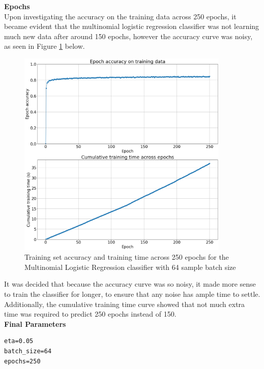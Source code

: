 \documentclass[11pt,a4paper]{article}
\begin{document}
\noindent \textbf{Epochs}\\
Upon investigating the accuracy on the training data across 250 epochs, it became evident that the multinomial logistic regression classifier was not learning much new data after around 150 epochs, however the accuracy curve was noisy, as seen in Figure \ref{fig:mlr_epoch_test} below.\\
    
\begin{figure}[H]
    \centering
    \includegraphics[width=0.9\textwidth]{img/mlr_epoch_test.png}
    \caption{Training set accuracy and training time across 250 epochs for the Multinomial Logistic Regression classifier with 64 sample batch size}
    \label{fig:mlr_epoch_test}
\end{figure}

\noindent It was decided that because the accuracy curve was so noisy, it made more sense to train the classifier for longer, to ensure that any noise has ample time to settle. Additionally, the cumulative training time curve showed that not much extra time was required to predict 250 epochs instead of 150.\\

\noindent \textbf{Final Parameters}
\begin{verbatim}
eta=0.05
batch_size=64
epochs=250
\end{verbatim}

\pagebreak
\end{document}
